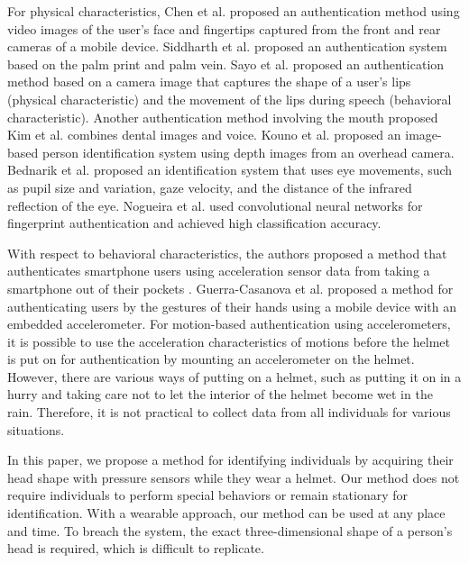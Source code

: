 \documentclass[sigconf,authordraft]{acmart}
\begin{document}
For physical characteristics, Chen et al. \cite{face_and_finger} proposed an authentication method using video images of the user's face and fingertips captured from the front and rear cameras of a mobile device. Siddharth et al. \cite{palm_print} proposed an authentication system based on the palm print and palm vein.
Sayo et al. \cite{lip_motion} proposed an authentication method based on a camera image that captures the shape of a user's lips (physical characteristic) and the movement of the lips during speech (behavioral characteristic). Another authentication method involving the mouth proposed Kim et al. \cite{teeth_and_voice} combines dental images and voice. Kouno et al. \cite{head_top_camera} proposed an image-based person identification system using depth images from an overhead camera. Bednarik et al. \cite{eye_movement} proposed an identification system that uses eye movements, such as pupil size and variation, gaze velocity, and the distance of the infrared reflection of the eye. Nogueira et al. \cite{finger_CNN} used convolutional neural networks for fingerprint authentication and achieved high classification accuracy.\par

With respect to behavioral characteristics, the authors proposed a method that authenticates smartphone users using acceleration sensor data from taking a smartphone out of their pockets \cite{murao_screen_unlock_blind}. Guerra-Casanova et al. \cite{accelerometer_authentification} proposed a method for authenticating users by the gestures of their hands using a mobile device with an embedded accelerometer. For motion-based authentication using accelerometers, it is possible to use the acceleration characteristics of motions before the helmet is put on for authentication by mounting an accelerometer on the helmet. However, there are various ways of putting on a helmet, such as putting it on in a hurry and taking care not to let the interior of the helmet become wet in the rain. Therefore, it is not practical to collect data from all individuals for various situations.\par

In this paper, we propose a method for identifying individuals by acquiring their head shape with pressure sensors while they wear a helmet. Our method does not require individuals to perform special behaviors or remain stationary for identification. With a wearable approach, our method can be used at any place and time. To breach the system, the exact three-dimensional shape of a person's head is required, which is difficult to replicate.
\end{document}
